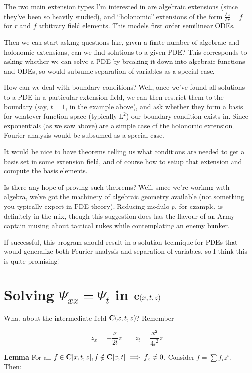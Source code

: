 \documentclass{article}
\newcommand{\C}{\ensuremath{{\bf C}}}
\begin{document}
The two main extension types I'm interested in are algebraic
extensions (since they've been so heavily studied), and ``holonomic''
extensions of the form $\frac{\delta z}{\delta r} = f$ for $r$ and
$f$ arbitrary field elements.  This models first order semilinear ODEs.

Then we can start asking questions like, given a finite number of
algebraic and holonomic extensions, can we find solutions to a given
PDE?  This corresponds to asking whether we can solve a PDE by
breaking it down into algebraic functions and ODEs, so would subsume
separation of variables as a special case.

How can we deal with boundary conditions?  Well, once we've found all
solutions to a PDE in a particular extension field, we can then
restrict them to the boundary (say, $t=1$, in the example above), and
ask whether they form a basis for whatever function space (typically
$\text{L}^2$) our boundary condition exists in.  Since exponentials
(as we saw above) are a simple case of the holonomic extension,
Fourier analysis would be subsumed as a special case.

It would be nice to have theorems telling us what conditions are
needed to get a basis set in some extension field, and of course how
to setup that extension and compute the basis elements.

Is there any hope of proving such theorems?  Well, since we're working
with algebra, we've got the machinery of algebraic geometry available
(not something you typically expect in PDE theory).  Reducing modulo
$p$, for example, is definitely in the mix, though this suggestion
does has the flavour of an Army captain musing about tactical nukes
while contemplating an enemy bunker.

If successful, this program should result in a solution technique for
PDEs that would generalize both Fourier analysis and separation of
variables, so I think this is quite promising!


\vfill\eject
\section*{Solving $\Psi_{xx}=\Psi_t$ in $\C(x,t,z)$}

What about the intermediate field $\C(x,t,z)$?  Remember

$$z_x = -\frac{x}{2t} z \qquad z_t = \frac{x^2}{4t^2} z$$

{\bf Lemma}  For all $f \in \C[x,t,z], f \notin \C[x,t] \implies f_x \ne 0$.
Consider $f = \sum f_i z^i$.  Then:
\end{document}
